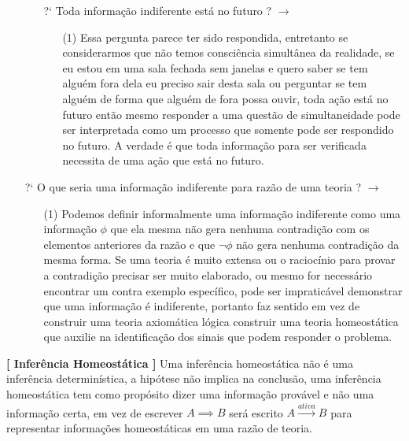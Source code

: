 \documentclass[10pt,a4paper]{report}
\begin{document}
\begin{itemize}
\begin{itemize}
\begin{itemize}
		\end{itemize}
		\item[ ] ?` Toda informação indiferente está no futuro ? $\rightarrow$
		\begin{itemize}
			\item[ (1) ] Essa pergunta parece ter sido respondida, entretanto se considerarmos que não temos consciência simultânea da realidade, se eu estou em uma sala fechada sem janelas e quero saber se tem alguém fora dela eu preciso sair desta sala ou perguntar se tem alguém de forma que alguém de fora possa ouvir, toda ação está no futuro então mesmo responder a uma questão de simultaneidade pode ser interpretada como um processo que somente pode ser respondido no futuro. A verdade é que toda informação para ser verificada necessita de uma ação que está no futuro.
		\end{itemize}
	\end{itemize}
	\item[ ] ?` O que seria uma informação indiferente para razão de uma teoria ? $\rightarrow$
	\begin{itemize}
		\item[ (1) ] Podemos definir informalmente uma informação indiferente como uma informação $\phi$ que ela mesma não gera nenhuma contradição com os elementos anteriores da razão e que $\neg \phi$ não gera nenhuma contradição da mesma forma. Se uma teoria é muito extensa ou o raciocínio para provar a contradição precisar ser muito elaborado, ou mesmo for necessário encontrar um contra exemplo específico, pode ser impraticável demonstrar que uma informação é indiferente, portanto faz sentido em vez de construir uma teoria axiomática lógica construir uma teoria homeostática que auxilie na identificação dos sinais que podem responder o problema.
	\end{itemize}
\end{itemize}

\hspace{\baselineskip}

\textbf{[ Inferência Homeostática ]} Uma inferência homeostática não é uma inferência determinística, a hipótese não implica na conclusão, uma inferência homeostática tem como propósito dizer uma informação provável e não uma informação certa, em vez de escrever $A \implies B$ será escrito $A \overset{ativa}{\rightarrow} B$ para representar informações homeostáticas em uma razão de teoria.\\
\end{document}
